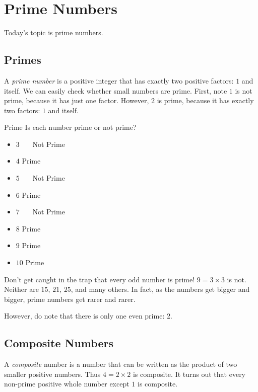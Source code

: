 \documentclass[a4paper,10pt]{report}
\begin{document}
\chapter{Prime Numbers}

Today's topic is prime numbers.

\section{Primes}
A \emph{prime number} is a positive integer that has exactly two positive
factors: $1$ and itself. We can easily check whether small numbers are prime.
First, note $1$ is not prime, because it has just one factor. However, $2$ is
prime, because it has exactly two factors: $1$ and itself.

\begin{problem}{Prime}
 Is each number prime or not prime?

 \begin{itemize}
  \item $3$ \hfill {}~~~Not Prime
  \item $4$ \hfill Prime~~~
  \item $5$ \hfill {}~~~Not Prime
  \item $6$ \hfill Prime~~~
  \item $7$ \hfill {}~~~Not Prime
  \item $8$ \hfill Prime~~~
  \item $9$ \hfill Prime~~~
  \item $10$ \hfill Prime~~~
 \end{itemize}
\end{problem}

Don't get caught in the trap that every odd number is prime! $9=3\times3$ is
not. Neither are $15$, $21$, $25$, and many others. In fact, as the numbers get
bigger and bigger, prime numbers get rarer and rarer.

However, do note that there is only one even prime: $2$.

\section{Composite Numbers}
A \emph{composite} number is a number that can be written as the product of two
smaller positive numbers. Thus $4=2\times2$ is composite. It turns out that
every non-prime positive whole number except $1$ is composite.
\end{document}

